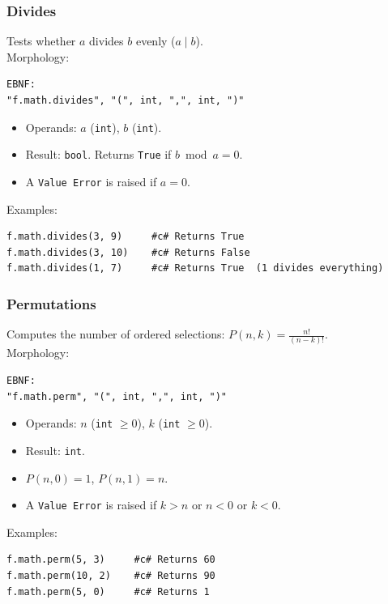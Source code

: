 \subsubsection{Divides}
Tests whether $a$ divides $b$ evenly ($a \mid b$). \\
Morphology:
\begin{verbatim}
EBNF:
"f.math.divides", "(", int, ",", int, ")"
\end{verbatim}
\begin{itemize}
\item Operands: $a$ (\texttt{int}), $b$ (\texttt{int}).
\item Result: \texttt{bool}. Returns \texttt{True} if $b \bmod a = 0$.
\item A \texttt{Value Error} is raised if $a = 0$.
\end{itemize}
Examples:
\begin{verbatim}
f.math.divides(3, 9)     #c# Returns True
f.math.divides(3, 10)    #c# Returns False
f.math.divides(1, 7)     #c# Returns True  (1 divides everything)
\end{verbatim}

\subsubsection{Permutations}
Computes the number of ordered selections: $P(n, k) = \frac{n!}{(n-k)!}$. \\
Morphology:
\begin{verbatim}
EBNF:
"f.math.perm", "(", int, ",", int, ")"
\end{verbatim}
\begin{itemize}
\item Operands: $n$ (\texttt{int} $\geq 0$), $k$ (\texttt{int} $\geq 0$).
\item Result: \texttt{int}.
\item $P(n, 0) = 1$, $P(n, 1) = n$.
\item A \texttt{Value Error} is raised if $k > n$ or $n < 0$ or $k < 0$.
\end{itemize}
Examples:
\begin{verbatim}
f.math.perm(5, 3)     #c# Returns 60
f.math.perm(10, 2)    #c# Returns 90
f.math.perm(5, 0)     #c# Returns 1
\end{verbatim}

